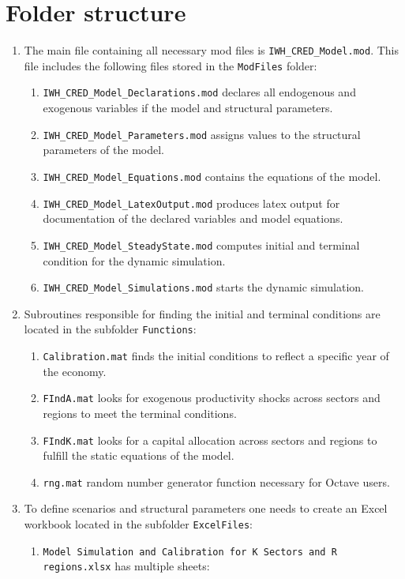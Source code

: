 \documentclass[10pt,a4paper]{article}
\begin{document}
\section{Folder structure}
\begin{enumerate}
\item The main file containing all necessary mod files is {\tt IWH_CRED_Model.mod}. This file includes the following files stored in the {\tt ModFiles} folder:
\begin{enumerate}
\item {\tt IWH_CRED_Model_Declarations.mod} declares all endogenous and exogenous variables if the model and structural parameters.
\item {\tt IWH_CRED_Model_Parameters.mod} assigns values to the structural parameters of the model.
\item {\tt IWH_CRED_Model_Equations.mod} contains the equations of the model.
\item {\tt IWH_CRED_Model_LatexOutput.mod} produces latex output for documentation of the declared variables and model equations.
\item {\tt IWH_CRED_Model_SteadyState.mod} computes initial and terminal condition for the dynamic simulation.
\item {\tt IWH_CRED_Model_Simulations.mod} starts the dynamic simulation.
\end{enumerate}
\item Subroutines responsible for finding the initial and terminal conditions are located in the subfolder {\tt Functions}:
\begin{enumerate}
\item {\tt Calibration.mat} finds the initial conditions to reflect a specific year of the economy.
\item {\tt FIndA.mat} looks for exogenous productivity shocks across sectors and regions to meet the terminal conditions.
\item {\tt FIndK.mat} looks for a capital allocation across sectors and regions to fulfill the static equations of the model.
\item {\tt rng.mat} random number generator function necessary for Octave users.
\end{enumerate}
\item To define scenarios and structural parameters one needs to create an Excel workbook located in the subfolder {\tt ExcelFiles}:
\begin{enumerate}
\item {\tt Model Simulation and Calibration for K Sectors and R regions.xlsx} has multiple sheets:

\end{enumerate}
\end{enumerate}
\end{document}
